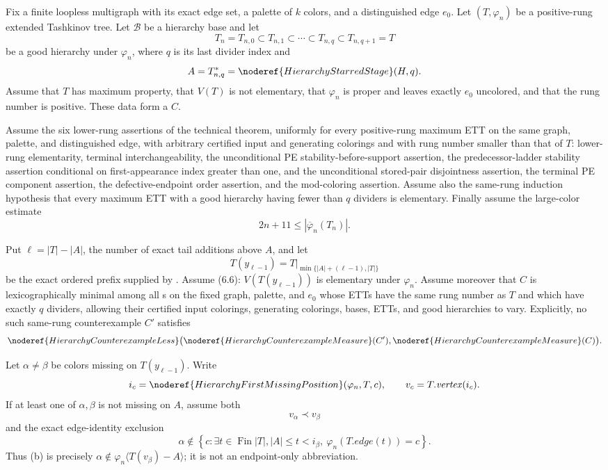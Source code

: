 \begin{lemma}
Fix a finite loopless multigraph with its exact edge set, a palette of
$k$ colors, and a distinguished edge $e_0$.  Let $(T,\varphi_n)$ be a
positive-rung extended Tashkinov tree.  Let $\mathcal B$ be a hierarchy
base and let
\[
 T_n=T_{n,0}\subset T_{n,1}\subset\cdots\subset
 T_{n,q}\subset T_{n,q+1}=T
\]
be a good hierarchy under $\varphi_n$, where $q$ is its last divider
index and
\[
 A=T_{n,q}^{*}=\noderef{HierarchyStarredStage}(H,q).
\]
Assume that $T$ has maximum property, that $V(T)$ is not elementary,
that $\varphi_n$ is proper and leaves exactly $e_0$ uncolored, and that
the rung number is positive.  These data form a
 $C$.

Assume the six lower-rung assertions of the technical theorem, uniformly
for every positive-rung maximum ETT on the same graph, palette, and
distinguished edge, with arbitrary certified input and generating
colorings and with rung number smaller than that of $T$: lower-rung
elementarity, terminal interchangeability, the unconditional PE stability-before-support assertion, the predecessor-ladder
stability assertion conditional on first-appearance index greater than one,
and the unconditional stored-pair disjointness assertion, the terminal PE component assertion, the
defective-endpoint order assertion, and the mod-coloring assertion.
Assume also the same-rung induction hypothesis that every maximum ETT
with a good hierarchy having fewer than $q$ dividers is elementary.
Finally assume the large-color estimate
\[
 2n+11\leq |\overline\varphi_n(T_n)|.
\]

Put $\ell=|T|-|A|$, the number of exact tail additions above $A$, and let
\[
 T(y_{\ell-1})=T\big|_{\min\{|A|+(\ell-1),|T|\}}
\]
be the exact ordered prefix supplied by .
Assume (6.6): $V(T(y_{\ell-1}))$ is elementary under $\varphi_n$.
Assume moreover that $C$ is lexicographically minimal among all
s on the fixed graph, palette, and
$e_0$ whose ETTs have the same rung number as $T$ and which have exactly
$q$ dividers, allowing their certified input colorings, generating
colorings, bases, ETTs, and good hierarchies to vary.  Explicitly, no
such same-rung counterexample $C'$ satisfies
\[
 \noderef{HierarchyCounterexampleLess}
  \bigl(\noderef{HierarchyCounterexampleMeasure}(C'),
        \noderef{HierarchyCounterexampleMeasure}(C)\bigr).
\]

Let $\alpha\ne\beta$ be colors missing on $T(y_{\ell-1})$.  Write
\[
 i_c=\noderef{HierarchyFirstMissingPosition}(\varphi_n,T,c),
 \qquad v_c=T.\mathit{vertex}(i_c).
\]
If at least one of $\alpha,\beta$ is not missing on $A$, assume both
\[
 v_\alpha\prec v_\beta                                      \tag{a}
\]
and the exact edge-identity exclusion
\[
 \alpha\notin
 \left\{c:\exists t\in\operatorname{Fin}|T|,
       |A|\leq t<i_\beta,
       \ \varphi_n(T.\mathit{edge}(t))=c\right\}.             \tag{b}
\]
Thus (b) is precisely
$\alpha\notin\varphi_n\langle T(v_\beta)-A\rangle$; it is not
an endpoint-only abbreviation.



\end{lemma}
